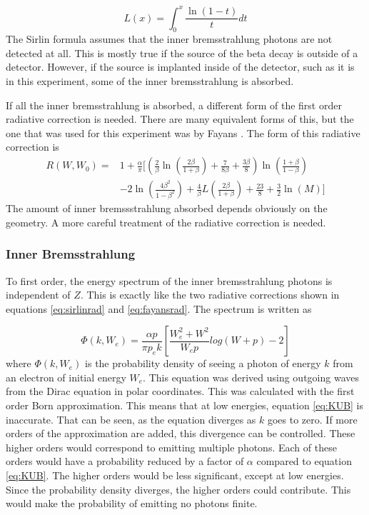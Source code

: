 \documentclass[../MaxHughesThesis.tex]{subfiles}
\begin{document}
\begin{equation}
	L(x) = \int_{0}^{x} \frac{\ln(1 - t)}{t}dt
	\label{eq:spence}
\end{equation}
The Sirlin formula assumes that the inner bremsstrahlung photons are not detected at all.
This is mostly true if the source of the beta decay is outside of a detector.
However, if the source is implanted inside of the detector, such as it is in this experiment, some of the inner bremsstrahlung is absorbed.

If all the inner bremsstrahlung is absorbed, a different form of the first order radiative correction is needed.
There are many equivalent forms of this, but the one that was used for this experiment was by Fayans \cite{Fay86}.
The form of this radiative correction is %
\begin{equation}	
	\label{eq:fayansrad}
	\begin{split}
	R(W,W_{0}) = & 1 + \frac{\alpha}{\pi}[(\frac{2}{\beta}\ln(\frac{2\beta}{1+\beta}) + \frac{7}{8\beta} + \frac{3\beta}{8})\ln(\frac{1 + \beta}{1 - \beta}) \\
	& - 2\ln(\frac{4\beta^{2}}{1 - \beta^{2}}) + \frac{4}{\beta}L(\frac{2\beta}{1+\beta}) + \frac{23}{8} + \frac{3}{2}\ln(M)]
	\end{split}
\end{equation}
The amount of inner bremssstrahlung absorbed depends obviously on the geometry.
A more careful treatment of the radiative correction is needed.

\subsubsection{Inner Bremsstrahlung}

To first order, the energy spectrum of the inner bremsstrahlung photons is independent of $Z$.
This is exactly like the two radiative corrections shown in equations \ref{eq:sirlinrad} and \ref{eq:fayansrad}. 
The spectrum is written as \cite{Kni36}%

\begin{equation}
	\Phi(k,W_{e}) = \frac{ \alpha p}{ \pi p_{e} k} [\frac{W_{e}^{2} + W^{2}}{W_{e}p}log(W + p) - 2]
	\label{eq:KUB}
\end{equation}
where $\Phi(k,W_{e})$ is the probability density of seeing a photon of energy $k$ from an electron of initial energy $W_{e}$.
This equation was derived using outgoing waves from the Dirac equation in polar coordinates.
This was calculated with the first order Born approximation.
This means that at low energies, equation \ref{eq:KUB} is inaccurate. 
That can be seen, as the equation diverges as $k$ goes to zero.
If more orders of the approximation are added, this divergence can be controlled.
These higher orders would correspond to emitting multiple photons.
Each of these orders would have a probability reduced by a factor of $\alpha$ compared to equation \ref{eq:KUB}.
The higher orders would be less significant, except at low energies. 
Since the probability density diverges, the higher orders could contribute.
This would make the probability of emitting no photons finite.	 		
\end{document}
